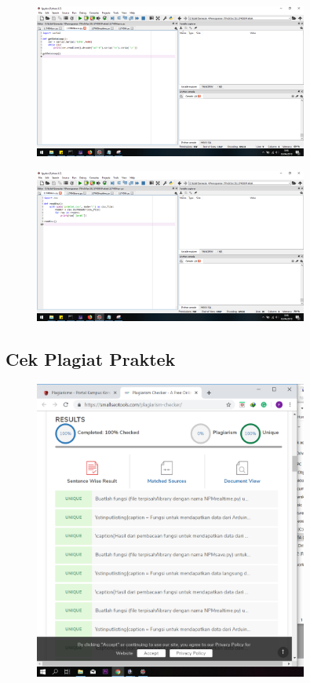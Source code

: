\begin{figure}[H]
	\includegraphics[width=9cm]{figures/5/1174026/Praktek/save.png}
	\centering
\end{figure}

\begin{figure}[H]
	\includegraphics[width=9cm]{figures/5/1174026/Praktek/csv.png}
	\centering
\end{figure}

\subsection{Cek Plagiat Praktek}
\begin{figure}[H]
	\includegraphics[width=9cm]{figures/5/1174026/Praktek/plagiat.png}
	\centering
\end{figure}

